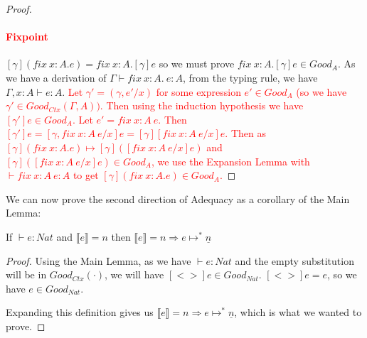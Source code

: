 \begin{proof}
\paragraph{\textcolor{red}{Fixpoint}} $[\gamma] (fix \ x:A. e) = fix \ x:A. [\gamma] e$ so we must prove $fix \ x:A. [\gamma] e  \in Good_A$. As we have a derivation of $\Gamma \vdash fix \ x:A. \ e : A$, from the typing rule, we have $\Gamma, x:A \vdash e: A$. \textcolor{red}{Let $\gamma' = (\gamma, e'/x)$ for some expression $e' \in Good_{A}$ (so we have $\gamma' \in Good_{Ctx}(\Gamma, A))$.  Then using the induction hypothesis we have $[\gamma']e \in Good_A$. 
Let $e' = fix \ x:A \ e$. Then $[\gamma']e = [\gamma,fix \ x:A \ e/x] e = [\gamma][fix \ x:A \ e/x]e$.
Then as $[\gamma](fix \ x:A. e) \mapsto [\gamma]([fix \ x:A \ e/x]e)$ and $[\gamma]([fix \ x:A \ e/x]e) \in Good_A$, we use the Expansion Lemma with $\vdash fix \ x:A \ e : A$ to get  $[\gamma](fix \ x:A. e) \in Good_A$.}

\end{proof}

We can now prove the second direction of Adequacy as a corollary of the Main Lemma:

\vspace{0.5cm}

\begin{cor}
If $\vdash e : Nat$ and $\llbracket e \rrbracket = n$ then $\llbracket e \rrbracket = n \Rightarrow e \mapsto^* \underline{n}$
\end{cor}

\begin{proof}
Using the Main Lemma, as we have $\vdash e : Nat$ and the empty substitution will be in $Good_{Ctx}(\cdot)$, we will have $[<>]e \in Good_{Nat}$. $[<>]e = e$, so we have $e \in Good_{Nat}$.

Expanding this definition gives us $\llbracket e \rrbracket = n \Rightarrow e \mapsto^* \underline{n}$, which is what we wanted to prove.
\end{proof}